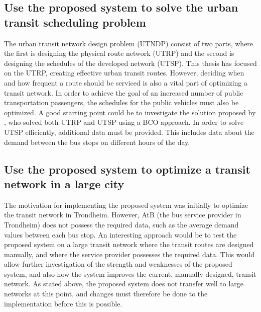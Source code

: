 \subsection*{Use the proposed system to solve the urban transit scheduling problem}
The urban transit network design problem (UTNDP) consist of two parts, where the first is designing the physical route network (UTRP) and the second is designing the schedules of the developed network (UTSP). This thesis has focused on the UTRP, creating effective urban transit routes. However, deciding when and how frequent a route should be serviced is also a vital part of optimizing a transit network. In order to achieve the goal of an increased number of public transportation passengers, the schedules for the public vehicles must also be optimized. A good starting point could be to investigate the solution proposed by \citet{nikolic14}, who solved both UTRP and UTSP using a BCO approach. In order to solve UTSP efficiently, additional data must be provided. This includes data about the demand between the bus stops on different hours of the day. 

\subsection*{Use the proposed system to optimize a transit network in a large city}
The motivation for implementing the proposed system was initially to optimize the transit network in Trondheim. However, AtB (the bus service provider in Trondheim) does not possess the required data, such as the average demand values between each bus stop. An interesting approach would be to test the proposed system on a large transit network where the transit routes are designed manually, and where the service provider possesses the required data. This would allow further investigation of the strength and weaknesses of the proposed system, and also how the system improves the current, manually designed, transit network. As stated above, the proposed system does not transfer well to large networks at this point, and changes must therefore be done to the implementation before this is possible. 



